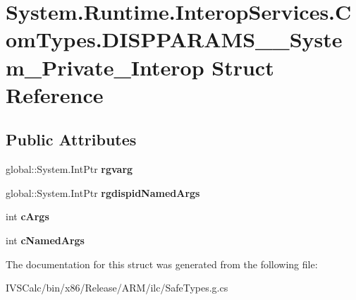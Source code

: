 \hypertarget{struct_system_1_1_runtime_1_1_interop_services_1_1_com_types_1_1_d_i_s_p_p_a_r_a_m_s_____system___private___interop}{}\section{System.\+Runtime.\+Interop\+Services.\+Com\+Types.\+D\+I\+S\+P\+P\+A\+R\+A\+M\+S\+\_\+\+\_\+\+System\+\_\+\+Private\+\_\+\+Interop Struct Reference}
\label{struct_system_1_1_runtime_1_1_interop_services_1_1_com_types_1_1_d_i_s_p_p_a_r_a_m_s_____system___private___interop}
\subsection*{Public Attributes}
\begin{DoxyCompactItemize}
\item 
\mbox{\label{struct_system_1_1_runtime_1_1_interop_services_1_1_com_types_1_1_d_i_s_p_p_a_r_a_m_s_____system___private___interop_ac887c8c2a92f1905799e1ba3cc7a96c9}} 
global\+::\+System.\+Int\+Ptr {\bfseries rgvarg}
\item 
\mbox{\label{struct_system_1_1_runtime_1_1_interop_services_1_1_com_types_1_1_d_i_s_p_p_a_r_a_m_s_____system___private___interop_a205ae681866694c4043688ebc77755df}} 
global\+::\+System.\+Int\+Ptr {\bfseries rgdispid\+Named\+Args}
\item 
\mbox{\label{struct_system_1_1_runtime_1_1_interop_services_1_1_com_types_1_1_d_i_s_p_p_a_r_a_m_s_____system___private___interop_adc3bc1cc2510a925cf3b5e13aeff2ce8}} 
int {\bfseries c\+Args}
\item 
\mbox{\label{struct_system_1_1_runtime_1_1_interop_services_1_1_com_types_1_1_d_i_s_p_p_a_r_a_m_s_____system___private___interop_a8ab4798a90dea00492d8c4b98d0c435f}} 
int {\bfseries c\+Named\+Args}
\end{DoxyCompactItemize}


The documentation for this struct was generated from the following file\+:\begin{DoxyCompactItemize}
\item 
I\+V\+S\+Calc/bin/x86/\+Release/\+A\+R\+M/ilc/Safe\+Types.\+g.\+cs\end{DoxyCompactItemize}
